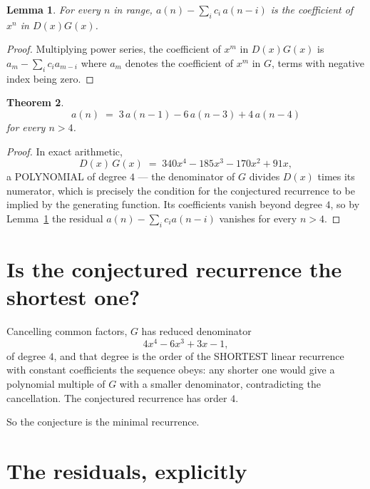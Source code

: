 \documentclass[11pt,a4paper]{article}
\theoremstyle{plain}
\newtheorem{theorem}{Theorem}
\newtheorem{lemma}[theorem]{Lemma}
\theoremstyle{definition}
\begin{document}
\begin{lemma}\label{lem:key}
For every $n$ in range, $a(n)-\sum_i c_i\,a(n-i)$ is the coefficient of $x^{n}$ in
$D(x)G(x)$.
\end{lemma}

\begin{proof}
Multiplying power series, the coefficient of $x^{m}$ in $D(x)G(x)$ is
$a_m-\sum_i c_i a_{m-i}$ where $a_m$ denotes the coefficient of $x^{m}$ in $G$, terms with
negative index being zero.
\end{proof}

\begin{theorem}
\[
a(n)\;=\;3\,a(n-1) - 6\,a(n-3) + 4\,a(n-4)
\]
for every $n>4$.
\end{theorem}

\begin{proof}
In exact arithmetic,
\[
D(x)\,G(x)\;=\;340 x^{4} - 185 x^{3} - 170 x^{2} + 91 x,
\]
a POLYNOMIAL of degree $4$ --- the denominator of $G$ divides $D(x)$ times its numerator,
which is precisely the condition for the conjectured recurrence to be implied by the
generating function. Its coefficients vanish beyond degree $4$, so by
Lemma~\ref{lem:key} the residual $a(n)-\sum_ic_ia(n-i)$ vanishes for every
$n>4$.
\end{proof}

\section{Is the conjectured recurrence the shortest one?}

Cancelling common factors, $G$ has reduced denominator
\[
4 x^{4} - 6 x^{3} + 3 x - 1,
\]
of degree $4$, and that degree is the order of the SHORTEST linear recurrence with
constant coefficients the sequence obeys: any shorter one would give a polynomial multiple of
$G$ with a smaller denominator, contradicting the cancellation. The conjectured recurrence has
order $4$.

So the conjecture is the minimal recurrence.

\section{The residuals, explicitly}
\end{document}
